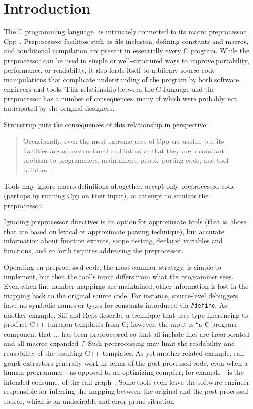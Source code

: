 \bigskip

\section{Introduction}

The C programming language~\cite{ansi} is intimately connected to its macro
preprocessor, Cpp~\cite[Ch.3]{Harbison91}.  Preprocessor facilities such as
file inclusion, defining constants and macros, and conditional compilation
are present in essentially every C program.   
While the preprocessor can be used in simple or well-structured ways to
improve portability, performance, or readability, it also lends itself to 
arbitrary source code manipulations that complicate understanding of the
program by both software engineers and tools.
This relationship
between the C language and the preprocessor has a number of consequences,
many of which were probably not anticipated by the original designers.

Stroustrup puts the consequences of this relationship in perspective:
\begin{quote}
Occasionally, even the most extreme uses of Cpp are useful, but its
facilities are so unstructured and intrusive that they are a constant
problem to programmers, maintainers, people porting code, and tool
builders~\cite[p.~424]{Stroustrup-DesignEvolution}.
\end{quote}

Tools may ignore macro definitions altogether, accept only preprocessed
code (perhaps by running Cpp on their input), or attempt to emulate the
preprocessor.

Ignoring preprocessor directives is an option for approximate tools (that
is, those that are based on lexical or approximate parsing technique), but
accurate information about function extents, scope nesting, declared
variables and functions, and so forth requires addressing the preprocessor.

Operating on preprocessed code, the most common strategy, is simple to
implement, but then the tool's input differs from what the
programmer sees.  Even when line number mappings are maintained, other
information is lost in the mapping back to the original source code.
For instance, source-level debuggers have no symbolic names or types
for constants introduced via \verb|#define|.  As another example, Siff
and Reps describe a technique that uses type inferencing to produce
C++ function templates from C; however, the input is ``a C program
component that $\ldots$ has been preprocessed so that all include
files are incorporated and all macros
expanded~\cite[p.~145]{Siff-fse96}.''  Such preprocessing may limit
the readability and reusability of the resulting C++ templates.  As
yet another related example, call graph extractors generally work in
terms of the post-processed code, even when a human programmer---as
opposed to an optimizing compiler, for example---is the intended
consumer of the call graph~\cite{Murphy-icse18}.  Some tools even
leave the software engineer responsible for inferring the mapping between the
original and the post-processed source, which is an undesirable and
error-prone situation.

